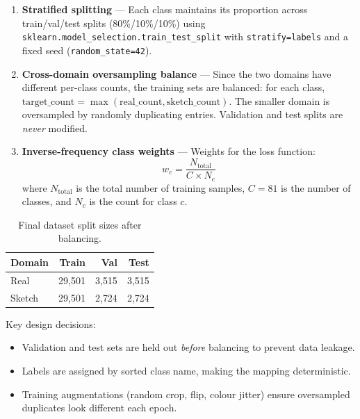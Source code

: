 \documentclass[12pt, a4paper]{article}
\begin{document}
\begin{enumerate}[leftmargin=*]
    \item \textbf{Stratified splitting} --- Each class maintains its proportion
          across train/val/test splits (80\%/10\%/10\%) using
          \texttt{sklearn.model\_selection.train\_test\_split} with
          \texttt{stratify=labels} and a fixed seed (\texttt{random\_state=42}).
    \item \textbf{Cross-domain oversampling balance} --- Since the two domains
          have different per-class counts, the training sets are balanced:
          for each class, $\text{target\_count} = \max(\text{real\_count},
          \text{sketch\_count})$.  The smaller domain is oversampled by
          randomly duplicating entries.  Validation and test splits are
          \emph{never} modified.
    \item \textbf{Inverse-frequency class weights} --- Weights for the loss
          function:
          \begin{equation}
              w_c = \frac{N_{\text{total}}}{C \times N_c}
              \label{eq:class_weights}
          \end{equation}
          where $N_{\text{total}}$ is the total number of training samples,
          $C = 81$ is the number of classes, and $N_c$ is the count for class
          $c$.
\end{enumerate}

\begin{table}[H]
\centering
\caption{Final dataset split sizes after balancing.}
\label{tab:splits}
\begin{tabular}{lrrr}
\toprule
\textbf{Domain} & \textbf{Train} & \textbf{Val} & \textbf{Test} \\
\midrule
Real   & 29{,}501 & 3{,}515 & 3{,}515 \\
Sketch & 29{,}501 & 2{,}724 & 2{,}724 \\
\bottomrule
\end{tabular}
\end{table}

Key design decisions:
\begin{itemize}[leftmargin=*]
    \item Validation and test sets are held out \emph{before} balancing to
          prevent data leakage.
    \item Labels are assigned by sorted class name, making the mapping
          deterministic.
    \item Training augmentations (random crop, flip, colour jitter) ensure
          oversampled duplicates look different each epoch.
\end{itemize}
\end{document}
